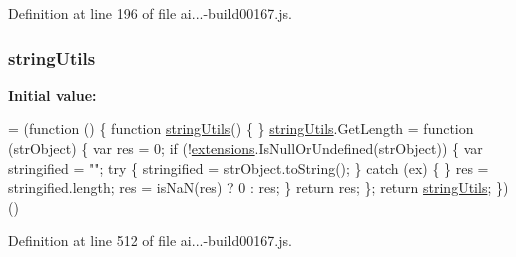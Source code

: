 Definition at line 196 of file ai...-\/build00167.\+js.

\subsubsection[{\texorpdfstring{string\+Utils}{stringUtils}}]{ string\+Utils}\hypertarget{obj_2_release_2_package_2_package_tmp_2_scripts_2ai_80_822_89-build00167_8js_a89651b896296468ad2af0726858df446}{}\label{obj_2_release_2_package_2_package_tmp_2_scripts_2ai_80_822_89-build00167_8js_a89651b896296468ad2af0726858df446}
{\bfseries Initial value\+:}
\begin{DoxyCode}
= (\textcolor{keyword}{function} () \{
            \textcolor{keyword}{function} \hyperlink{obj_2_release_2_package_2_package_tmp_2_scripts_2ai_80_822_89-build00167_8js_a89651b896296468ad2af0726858df446}{stringUtils}() \{
            \}
            \hyperlink{obj_2_release_2_package_2_package_tmp_2_scripts_2ai_80_822_89-build00167_8js_a89651b896296468ad2af0726858df446}{stringUtils}.GetLength = \textcolor{keyword}{function} (strObject) \{
                var res = 0;
                \textcolor{keywordflow}{if} (!\hyperlink{obj_2_release_2_package_2_package_tmp_2_scripts_2ai_80_822_89-build00167_8js_a9ce4e17b92e5debce1c72727f3bdd551}{extensions}.IsNullOrUndefined(strObject)) \{
                    var stringified = \textcolor{stringliteral}{""};
                    \textcolor{keywordflow}{try} \{
                        stringified = strObject.toString();
                    \}
                    \textcolor{keywordflow}{catch} (ex) \{
                    \}
                    res = stringified.length;
                    res = isNaN(res) ? 0 : res;
                \}
                \textcolor{keywordflow}{return} res;
            \};
            \textcolor{keywordflow}{return} \hyperlink{obj_2_release_2_package_2_package_tmp_2_scripts_2ai_80_822_89-build00167_8js_a89651b896296468ad2af0726858df446}{stringUtils};
        \})()
\end{DoxyCode}


Definition at line 512 of file ai...-\/build00167.\+js.

